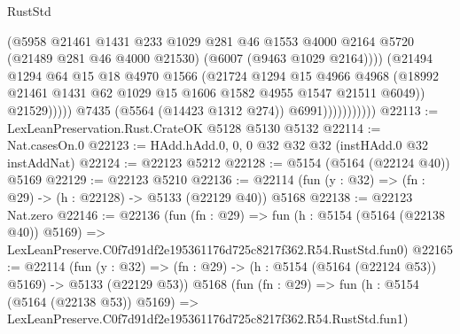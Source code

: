 \begin{lexlean}{RustStd}
\begin{coremodule}
                                    (@5958
                                      @21461
                                      @1431
                                      @233
                                      @1029
                                      @281
                                      @46
                                      @1553
                                      @4000
                                      @2164
                                      @5720
                                      (@21489 @281 @46 @4000 @21530)
                                      (@6007 (@9463 @1029 @2164))))
                                  (@21494
                                    @1294
                                    @64
                                    @15
                                    @18
                                    @4970
                                    @1566
                                    (@21724
                                      @1294
                                      @15
                                      @4966
                                      @4968
                                      (@18992
                                        @21461
                                        @1431
                                        @62
                                        @1029
                                        @15
                                        @1606
                                        @1582
                                        @4955
                                        @1547
                                        @21511
                                        @6049))
                                    @21529)))))
                          @7435
                          (@5564 (@14423 @1312 @274))
                          @6991)))))))))))
@22113 := LexLeanPreservation.Rust.CrateOK @5128 @5130 @5132
@22114 := Nat.casesOn.{0}
@22123 := HAdd.hAdd.{0, 0, 0} @32 @32 @32 (instHAdd.{0} @32 instAddNat)
@22124 := @22123 @5212
@22128 := @5154 (@5164 (@22124 @40)) @5169
@22129 := @22123 @5210
@22136 := @22114 (fun (y : @32) => (fn : @29) -> (h : @22128) -> @5133 (@22129 @40)) @5168
@22138 := @22123 Nat.zero
@22146 := @22136
    (fun (fn : @29) =>
    fun (h : @5154 (@5164 (@22138 @40)) @5169) =>
    LexLeanPreserve.C0f7d91df2e195361176d725c8217f362.R54.RustStd.fun0)
@22165 := @22114
    (fun (y : @32) => (fn : @29) -> (h : @5154 (@5164 (@22124 @53)) @5169) -> @5133 (@22129 @53))
    @5168
    (fun (fn : @29) =>
    fun (h : @5154 (@5164 (@22138 @53)) @5169) =>
    LexLeanPreserve.C0f7d91df2e195361176d725c8217f362.R54.RustStd.fun1)

\end{coremodule}
\end{lexlean}

